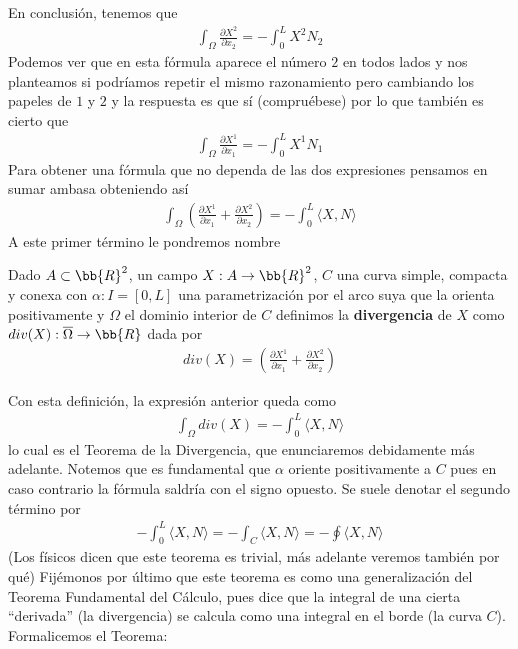 En conclusión, tenemos que 
\begin{gather*}
    \boxed{\int_\Omega \frac{\partial X^2}{\partial x_2} = - \int_0^L X^2 N_2}
\end{gather*}
Podemos ver que en esta fórmula aparece el número $2$ en todos lados y nos planteamos si podríamos repetir el mismo razonamiento pero cambiando los papeles de $1$ y $2$ y la respuesta es que sí (compruébese) por lo que también es cierto que
\begin{gather*}
    \boxed{\int_\Omega \frac{\partial X^1}{\partial x_1} = - \int_0^L X^1 N_1}
\end{gather*}
Para obtener una fórmula que no dependa de las dos expresiones pensamos en sumar ambasa obteniendo así
\begin{gather*}
    \int_\Omega \left( \frac{\partial X^1}{\partial x_1} + \frac{\partial X^2}{\partial x_2} \right) = - \int_0^L \langle X, N \rangle
\end{gather*}
A este primer término le pondremos nombre
\begin{definicion}
    Dado $A\subset \bb{R}^2$, un campo $X:A \to \bb{R}^2$, $C$ una curva simple, compacta y conexa con $\alpha: I=[0,L]$ una parametrización por el arco suya que la orienta positivamente y $\Omega$ el dominio interior de $C$ definimos la \textbf{divergencia} de $X$ como $div(X):\overline{\Omega}\to \bb{R}$ dada por
    \begin{gather*}
        div(X) = \left( \frac{\partial X^1}{\partial x_1} + \frac{\partial X^2}{\partial x_2} \right)
    \end{gather*}
\end{definicion}

Con esta definición, la expresión anterior queda como 
\begin{gather*}
    \boxed{\int_\Omega div(X) = - \int_0^L \langle X, N \rangle}
\end{gather*}
lo cual es el Teorema de la Divergencia, que enunciaremos debidamente más adelante. Notemos que es fundamental que $\alpha$ oriente positivamente a $C$ pues en caso contrario la fórmula saldría con el signo opuesto. Se suele denotar el segundo término por 
\begin{gather*}
    - \int_0^L \langle X, N \rangle = - \int_C \langle X, N \rangle = - \oint \langle X, N \rangle
\end{gather*}
(Los físicos dicen que este teorema es trivial, más adelante veremos también por qué) Fijémonos por último que este teorema es como una generalización del Teorema Fundamental del Cálculo, pues dice que la integral de una cierta ``derivada'' (la divergencia) se calcula como una integral en el borde (la curva $C$). Formalicemos el Teorema:

